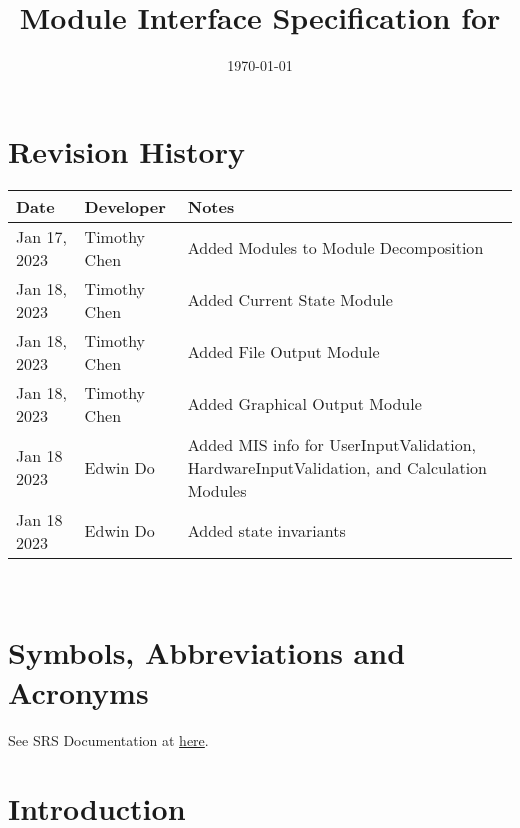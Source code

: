 \documentclass[12pt, titlepage]{article}
\begin{document}
\title{Module Interface Specification for \progname{}}

\author{\authname}

\date{\today}

\maketitle


\section{Revision History}

\begin{tabularx}{\textwidth}{p{3cm}p{2cm}X}
\toprule {\bf Date} & {\bf Developer} & {\bf Notes}\\
\midrule
Jan 17, 2023 & Timothy Chen & Added Modules to Module Decomposition\\
Jan 18, 2023 & Timothy Chen & Added Current State Module \\
Jan 18, 2023 & Timothy Chen & Added File Output Module \\
Jan 18, 2023 & Timothy Chen & Added Graphical Output Module \\
Jan 18 2023 & Edwin Do & Added MIS info for UserInputValidation, HardwareInputValidation, and Calculation Modules\\
Jan 18 2023 & Edwin Do & Added state invariants\\
\bottomrule
\end{tabularx}

~\newpage

\section{Symbols, Abbreviations and Acronyms}

See SRS Documentation at \href{https://github.com/edwin-do/capstoneTeam30/blob/main/docs/SRS/SRS.pdf}{here}.


\newpage

\tableofcontents

\newpage


\section{Introduction}
\end{document}
